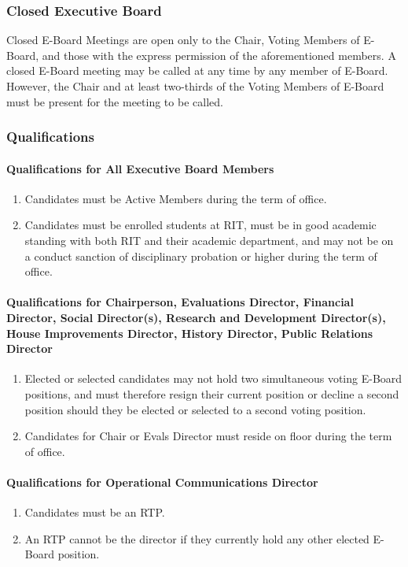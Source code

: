\documentclass{article}
\newcommand{\asubsection}[1]{\subsubsection{#1} \label{#1}}
\newcommand{\asubsubsection}[1]{\paragraph{#1} \label{#1}}
\begin{document}
\asubsection{Closed Executive Board}
Closed E-Board Meetings are open only to the Chair, Voting Members of E-Board, and those with the express permission of the aforementioned members.
A closed E-Board meeting may be called at any time by any member of E-Board.
However, the Chair and at least two-thirds of the Voting Members of E-Board must be present for the meeting to be called.

\asubsection{Qualifications}

\asubsubsection{Qualifications for All Executive Board Members}
\begin{enumerate}
	\item Candidates must be Active Members during the term of office.
	\item Candidates must be enrolled students at RIT, must be in good academic standing with both RIT and their academic department, and may not be on a conduct sanction of disciplinary probation or higher during the term of office.
\end{enumerate}

\asubsubsection{Qualifications for Chairperson, Evaluations Director, Financial Director, Social Director(s), Research and Development Director(s), House Improvements Director, History Director, Public Relations Director}
\begin{enumerate}
	\item Elected or selected candidates may not hold two simultaneous voting E-Board positions, and must therefore resign their current position or decline a second position should they be elected or selected to a second voting position.
	\item Candidates for Chair or Evals Director must reside on floor during the term of office.
\end{enumerate}

\asubsubsection{Qualifications for Operational Communications Director}
\begin{enumerate}
	\item Candidates must be an RTP.
	\item An RTP cannot be the director if they currently hold any other elected E-Board position. %
\end{enumerate}
\end{document}
